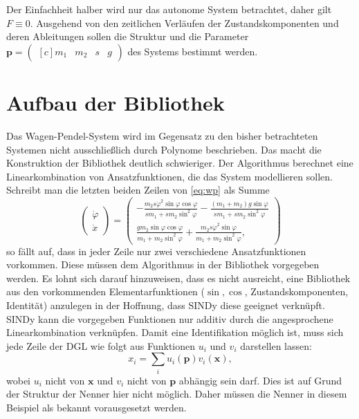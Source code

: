 Der Einfachheit halber wird nur das autonome System betrachtet, daher gilt $F\equiv0$. 
Ausgehend von den zeitlichen Verläufen der Zustandskomponenten und deren Ableitungen sollen die Struktur und die Parameter $\boldsymbol{p}=\begin{pmatrix*}[c] m_1& m_2& s & g \end{pmatrix*}$ des Systems bestimmt werden.

\section{Aufbau der Bibliothek}
\label{sec:aufbauderbibo}
Das Wagen-Pendel-System wird im Gegensatz zu den bisher betrachteten Systemen nicht ausschließlich durch Polynome beschrieben. Das macht die Konstruktion der Bibliothek deutlich schwieriger. Der Algorithmus berechnet eine Linearkombination von Ansatzfunktionen, die das System modellieren sollen. Schreibt man die letzten beiden Zeilen von \eqref{eq:wp} als Summe
\begin{equation}
	\begin{pmatrix}
		\dot{\varphi}  \\
		\dot{x}  	
	\end{pmatrix}
	=\begin{pmatrix}
		-\frac{m_2s\dot{\varphi}^2\sin\varphi\cos\varphi}{sm_1 + sm_2\sin^2\varphi} - \frac{(m_1+m_2)g\sin\varphi}{sm_1 + sm_2\sin^2\varphi}\\
		\frac{gm_2\sin\varphi\cos\varphi}{m_1+m_2\sin^2\varphi} + \frac{m_2s\dot{\varphi}^2\sin\varphi}{m_1+m_2\sin^2\varphi}  , 
	\end{pmatrix}		
\end{equation}
so fällt auf, dass in jeder Zeile nur zwei verschiedene Ansatzfunktionen vorkommen. Diese müssen dem Algorithmus in der Bibliothek vorgegeben werden. Es lohnt sich darauf hinzuweisen, dass es nicht ausreicht, eine Bibliothek aus den vorkommenden Elementarfunktionen ($\sin, \cos$, Zustandskomponenten, Identität) anzulegen in der Hoffnung, dass SINDy diese geeignet verknüpft. SINDy kann die vorgegeben Funktionen nur additiv durch die angesprochene Linearkombination verknüpfen. 
Damit eine Identifikation möglich ist, muss sich jede Zeile der DGL wie folgt aus Funktionen $u_i$ und $v_i$ darstellen lassen:
\begin{equation}
x_i=\sum_{i}u_i(\boldsymbol{p})v_i(\boldsymbol{x}), \label{eq:right_side_decomp}
\end{equation}
wobei $u_i$ nicht von $\boldsymbol{x}$ und $v_i$ nicht von $\boldsymbol{p}$ abhängig sein darf. Dies ist auf Grund der Struktur der Nenner hier nicht möglich. Daher müssen die Nenner in diesem Beispiel als bekannt vorausgesetzt werden. 
